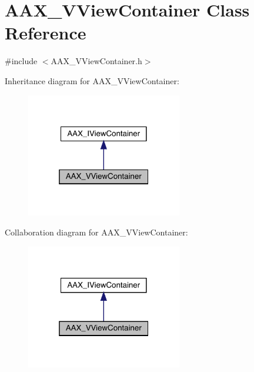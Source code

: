 \hypertarget{a01945}{}\section{A\+A\+X\+\_\+\+V\+View\+Container Class Reference}
\label{a01945}


{\ttfamily \#include $<$A\+A\+X\+\_\+\+V\+View\+Container.\+h$>$}



Inheritance diagram for A\+A\+X\+\_\+\+V\+View\+Container\+:
\nopagebreak
\begin{figure}[H]
\begin{center}
\leavevmode
\includegraphics[width=193pt]{a01944}
\end{center}
\end{figure}


Collaboration diagram for A\+A\+X\+\_\+\+V\+View\+Container\+:
\nopagebreak
\begin{figure}[H]
\begin{center}
\leavevmode
\includegraphics[width=193pt]{a01943}
\end{center}
\end{figure}


